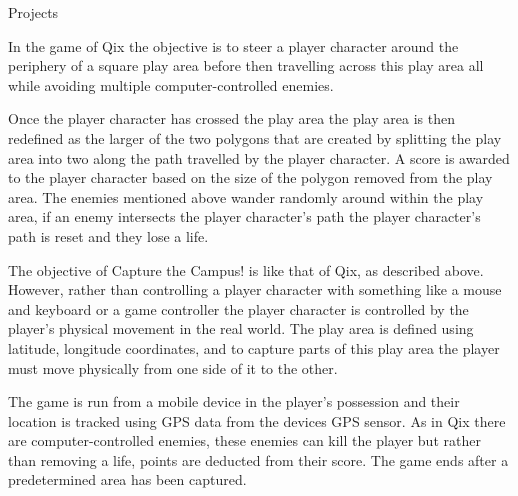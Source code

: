 \documentclass{cv}
\begin{document}
\begin{rSection}{Projects}
\item In the game of Qix the objective is to steer a player character around the periphery of a square play area before then travelling across this play area all while avoiding multiple computer-controlled enemies.

\item Once the player character has crossed the play area the play area is then redefined as the larger of the two polygons that are created by splitting the play area into two along the path travelled by the player character. A score is awarded to the player character based on the size of the polygon removed from the play area. The enemies mentioned above wander randomly around within the play area, if an enemy intersects the player character’s path the player character’s path is reset and they lose a life.

\item The objective of Capture the Campus! is like that of Qix, as described above. However, rather than controlling a player character with something like a mouse and keyboard or a game controller the player character is controlled by the player’s physical movement in the real world.
The play area is defined using latitude, longitude coordinates, and to capture parts of this play area the player must move physically from one side of it to the other.

\item The game is run from a mobile device in the player’s possession and their location is tracked using GPS data from the devices GPS sensor.
As in Qix there are computer-controlled enemies, these enemies can kill the player but rather than removing a life, points are deducted from their score.
The game ends after a predetermined area has been captured.
\end{rSection}
\end{document}
